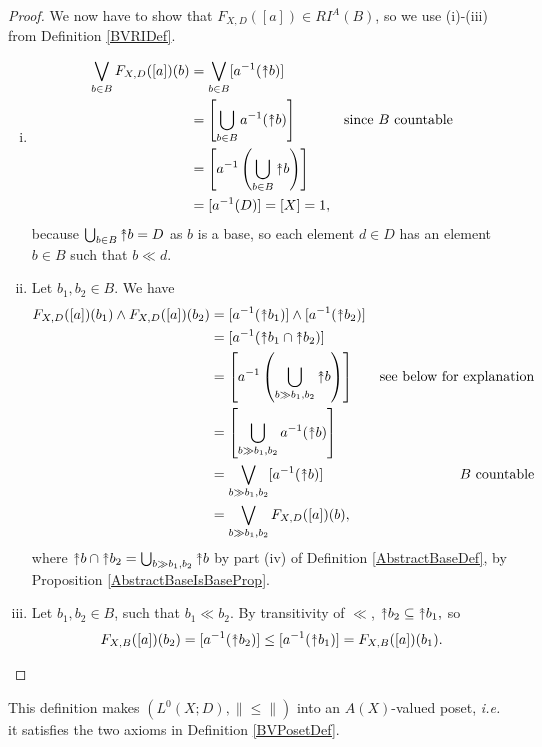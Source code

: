 \documentclass{lmcs}
\newcommand{\uu}{\rotatebox[origin=c]{90}{$\twoheadrightarrow$}}
\newcommand{\bleq}{\|\mbox{$\leq$}\|}
\begin{document}
\begin{proof}
We now have to show that $F_{X,D}([a]) \in RI^A(B)$, so we use (i)-(iii) from Definition \ref{BVRIDef}. 
\begin{enumerate}[(i)]
\item \begin{align*}
\bigvee_{b \in B} F_{X,D}([a])(b) &= \bigvee_{b \in B} [a^{-1}(\uu b)] \\
 &= \left[\bigcup_{b \in B} a^{-1}(\uu b)\right] & \text{since } B \text{ countable} \\
 &= \left[a^{-1}\left(\bigcup_{b \in B} \uu b\right)\right] \\
 &= [a^{-1}(D)] = [X] = 1,
\end{align*}
because $\bigcup_{b \in B} \uu b = D$ as $b$ is a base, so each element $d \in D$ has an element $b \in B$ such that $b \ll d$. 
\item Let $b_1,b_2 \in B$. We have
\begin{align*}
F_{X,D}([a])(b_1) \land F_{X,D}([a])(b_2) &= [a^{-1}(\uu b_1)] \land [a^{-1}(\uu b_2)] \\
 &= [a^{-1}(\uu b_1 \cap \uu b_2)] \\
 &= \left[a^{-1}\left(\bigcup_{b \gg b_1,b_2} \uu b\right)\right] & \text{see below for explanation} \\
 &= \left[\bigcup_{b \gg b_1,b_2} a^{-1}(\uu b)\right] \\
 &= \bigvee_{b \gg b_1,b_2} [a^{-1}(\uu b)] & B \text{ countable} \\
 &= \bigvee_{b \gg b_1,b_2} F_{X,D}([a])(b),
\end{align*}
where $\uu b \cap \uu b_2 = \bigcup_{b \gg b_1,b_2} \uu b$ by part (iv) of Definition \ref{AbstractBaseDef}, by Proposition \ref{AbstractBaseIsBaseProp}. 
\item Let $b_1,b_2 \in B$, such that $b_1 \ll b_2$. By transitivity of $\ll$, $\uu b_2 \subseteq \uu b_1,$ so 
\[
F_{X,B}([a])(b_2) = [a^{-1}(\uu b_2)] \leq [a^{-1}(\uu b_1)] = F_{X,B}([a])(b_1).
\]
\end{enumerate}
\end{proof}

This definition makes $(L^0(X;D),\bleq)$ into an $A(X)$-valued poset, \emph{i.e.} it satisfies the two axioms in Definition \ref{BVPosetDef}. 
\end{document}
